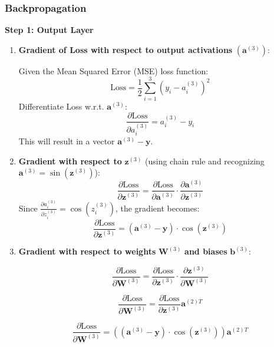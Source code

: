 \subsubsection{Backpropagation}

\textbf{Step 1: Output Layer}
\begin{enumerate}[label=\textbf{\roman*.}]
  \item \textbf{Gradient of Loss with respect to output activations} $(\mathbf{a}^{(3)})$:
  
  Given the Mean Squared Error (MSE) loss function:
  \begin{equation}
  \text{Loss} = \frac{1}{2} \sum_{i=1}^{3} (y_i - a^{(3)}_i)^2
  \end{equation}
  Differentiate Loss w.r.t. $\mathbf{a}^{(3)}$:
  \begin{equation}
  \frac{\partial \text{Loss}}{\partial a^{(3)}_i} = a^{(3)}_i - y_i
  \end{equation}
  This will result in a vector $\mathbf{a}^{(3)} - \mathbf{y}$.

  \item \textbf{Gradient with respect to} $\mathbf{z}^{(3)}$ (using chain rule and recognizing $\mathbf{a}^{(3)} = \sin(\mathbf{z}^{(3)})$):
  \[
  \frac{\partial \text{Loss}}{\partial \mathbf{z}^{(3)}} = \frac{\partial \text{Loss}}{\partial \mathbf{a}^{(3)}} \cdot \frac{\partial \mathbf{a}^{(3)}}{\partial \mathbf{z}^{(3)}}
  \]
  Since $\frac{\partial a^{(3)}_i}{\partial z^{(3)}_i} = \cos(z^{(3)}_i)$, the gradient becomes:
  \begin{equation}
  \frac{\partial \text{Loss}}{\partial \mathbf{z}^{(3)}} = (\mathbf{a}^{(3)} - \mathbf{y}) \cdot \cos(\mathbf{z}^{(3)})
  \end{equation}

  \item \textbf{Gradient with respect to weights} $\mathbf{W}^{(3)}$ \textbf{and biases} $\mathbf{b}^{(3)}$:
  
  \[
  \frac{\partial \text{Loss}}{\partial \mathbf{W}^{(3)}} = \frac{\partial \text{Loss}}{\partial \mathbf{z}^{(3)}} \cdot \frac{\partial \mathbf{z}^{(3)}}{\partial \mathbf{W}^{(3)}}
  \]
  
  \[
  \frac{\partial \text{Loss}}{\partial \mathbf{W}^{(3)}} = \frac{\partial \text{Loss}}{\partial \mathbf{z}^{(3)}} \mathbf{a}^{(2)T}
  \]
  
  \begin{equation}
  \frac{\partial \text{Loss}}{\partial \mathbf{W}^{(3)}} = \left((\mathbf{a}^{(3)} - \mathbf{y}) \cdot \cos(\mathbf{z}^{(3)})\right) \mathbf{a}^{(2)T}
  \end{equation}



\end{enumerate}
